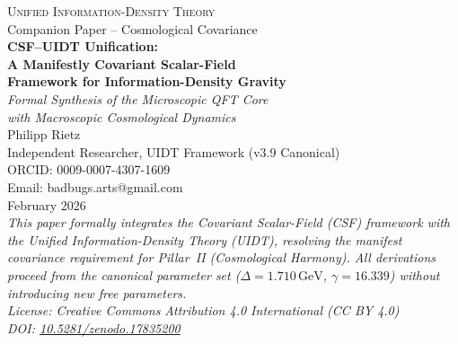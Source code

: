 \documentclass[12pt,a4paper,twoside]{article}
\theoremstyle{plain}
\theoremstyle{definition}
\theoremstyle{remark}
\newcommand{\GeV}{\,\mathrm{GeV}}
\begin{document}
\sloppy

\begin{titlepage}
\centering
\vspace*{2cm}
{\Large\scshape Unified Information-Density Theory}\\[0.5cm]
{\large Companion Paper -- Cosmological Covariance}\\[1cm]
{\Huge\bfseries CSF--UIDT Unification:\\[0.3cm]
A Manifestly Covariant Scalar-Field\\[0.3cm]
Framework for Information-Density Gravity}\\[1.5cm]
{\Large\itshape Formal Synthesis of the Microscopic QFT Core\\[0.2cm]
with Macroscopic Cosmological Dynamics}\\[3cm]
{\large Philipp Rietz}\\[0.3cm]
{\normalsize Independent Researcher, UIDT Framework (v3.9 Canonical)}\\
{\small ORCID: 0009-0007-4307-1609}\\
{\small Email: badbugs.arts@gmail.com}\\[0.6cm]
{\normalsize February 2026}\\[0.8cm]
\vfill
{\small\itshape
This paper formally integrates the Covariant Scalar-Field (CSF) framework
with the Unified Information-Density Theory (UIDT), resolving the manifest
covariance requirement for Pillar~II (Cosmological Harmony). All derivations
proceed from the canonical parameter set ($\Delta = 1.710\GeV$,
$\gamma = 16.339$) without introducing new free parameters.\\[0.5cm]
License: Creative Commons Attribution 4.0 International (CC BY 4.0)\\
DOI: \href{https://doi.org/10.5281/zenodo.17835200}{10.5281/zenodo.17835200}}
\end{titlepage}
\end{document}
